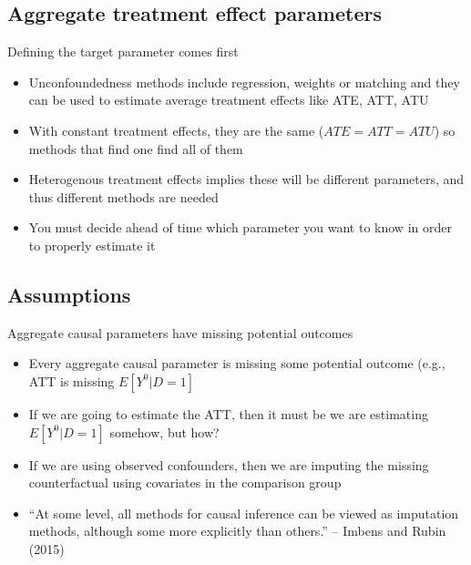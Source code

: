 \documentclass{beamer}
\begin{document}
\subsection{Aggregate treatment effect parameters}


\begin{frame}{Defining the target parameter comes first}

\begin{itemize}
\item Unconfoundedness methods include regression, weights or matching and they can be used to estimate average treatment effects like ATE, ATT, ATU
\item With constant treatment effects, they are the same ($ATE=ATT=ATU$) so methods that find one find all of them
\item Heterogenous treatment effects implies these will be different parameters, and thus different methods are needed
\item You must decide ahead of time which parameter you want to know in order to properly estimate it

\end{itemize}

\end{frame}



\subsection{Assumptions}


\begin{frame}{Aggregate causal parameters have missing potential outcomes}


\begin{itemize}
\item Every aggregate causal parameter is missing some potential outcome (e.g., ATT is missing $E[Y^0|D=1]$
\item If we are going to estimate the ATT, then it must be we are estimating $E[Y^0|D=1]$ somehow, but how?
\item If we are using observed confounders, then we are imputing the missing counterfactual using covariates in the comparison group
\item ``At some level, all methods for causal inference can be viewed as imputation methods, although some more explicitly than others.'' -- Imbens and Rubin (2015)

\end{itemize}


\end{frame}
\end{document}
